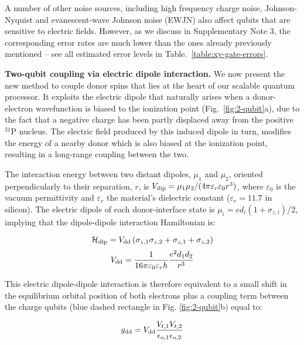 \documentclass[aps,prb,superscriptaddress,nobibnotes,preprint]{revtex4-1}%
\begin{document}
A number of other noise sources, including high frequency charge noise, Johnson-Nyquist and evanescent-wave Johnson noise \cite{Henkel1999} (EWJN) also affect qubits that are sensitive to electric fields. However, as we discuss in Supplementary Note 3, the corresponding error rates are much lower than the ones already previously mentioned -- see all estimated error levels in Table.~\ref{table:xy-gate-errors}.


\vspace{3mm}
\noindent\textbf{Two-qubit coupling via electric dipole interaction.}
%
We now present the new method to couple donor spins that lies at the heart of our scalable quantum processor. It exploits the electric dipole that naturally arises when a donor-electron wavefunction is biased to the ionization point (Fig.~\ref{fig:2-qubit}a), due to the fact that a negative charge has been partly displaced away from the positive $^{31}$P nucleus. The electric field produced by this induced dipole in turn, modifies the energy of a nearby donor which is also biased at the ionization point, resulting in a long-range coupling between the two.

The interaction energy between two distant dipoles, $\mu_1$ and $\mu_2$, oriented perpendicularly to their separation, $r$, is \cite{Ravets2014} $V_{\rm dip}=\mu_1\mu_2/(4\pi\varepsilon_r\varepsilon_0r^3)$, where $\varepsilon_0$ is the vacuum permittivity and $\varepsilon_r$ the material's dielectric constant ($\varepsilon_r=11.7$ in silicon). The electric dipole of each donor-interface state is $\mu_i=ed_i(1+\sigma_{z,i})/2$, implying that the dipole-dipole interaction Hamiltonian is:

\begin{equation} \label{eq:H_dipdip}
\mathcal{H}_{\rm dip}=V_{\rm dd}\left(\sigma_{z,1}\sigma_{z,2}+\sigma_{z,1}+\sigma_{z,2}\right)
\end{equation}
\begin{equation} \label{eq:V_dd}
V_{\rm dd}=\frac{1}{16\pi\varepsilon_0\varepsilon_r h}\frac{e^2d_1 d_2}{r^3}
\end{equation}

This electric dipole-dipole interaction is therefore equivalent to a small shift in the equilibrium orbital position of both electrons plus a coupling term between the charge qubits (blue dashed rectangle in Fig. \ref{fig:2-qubit}b) equal to:

\begin{equation} \label{eq:g_dd}
g_{\rm dd}=V_{\rm dd}\frac{V_{t,1}V_{t,2}}{\epsilon_{\rm o,1}\epsilon_{\rm o,2}}
\end{equation}
\end{document}
